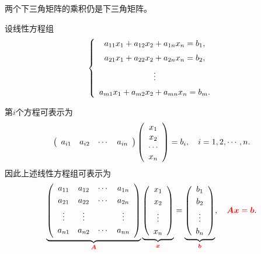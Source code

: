 \begin{zhu}
  两个下三角矩阵的乘积仍是下三角矩阵。
\end{zhu}

设线性方程组
$$
\left\{
  \begin{array}{c}
    a_{11}x_1 + a_{12}x_2 + a_{1n}x_n = b_1, \\[0.2cm]
    a_{21}x_1 + a_{22}x_2 + a_{2n}x_n = b_2, \\[0.2cm]
    \vdots \\[0.2cm]
    a_{m1}x_1 + a_{m2}x_2 + a_{mn}x_n = b_m.
  \end{array}
\right.
$$

第$i$个方程可表示为
$$
\left(
  \begin{array}{cccc}
    a_{i1} & a_{i2} & \cdots &  a_{in}
  \end{array}
\right)
\left(
  \begin{array}{c}
    x_{1} \\
    x_{2} \\
    \cdots   \\
    x_{n}
  \end{array}
\right) = b_i, \quad i=1,2,\cdots,n.
$$ 
因此上述线性方程组可表示为
$$
\underbrace{
  \left(
    \begin{array}{cccc}
      a_{11} & a_{12} & \cdots &  a_{1n} \\[0.1cm]
      a_{21} & a_{22} & \cdots &  a_{2n} \\[0.1cm]
      \vdots   & \vdots   &     & \vdots \\[0.1cm]
      a_{n1} & a_{n2} & \cdots &  a_{nn} \\[0.1cm]
    \end{array}
  \right)
}_{\textcolor{red}{\boldsymbol{A}}}
\underbrace{
  \left(
    \begin{array}{c}
      x_{1} \\[0.1cm]
      x_{2} \\[0.1cm]
      \vdots  \\[0.1cm]
      x_{n}
    \end{array}
  \right)
}_{\textcolor{red}{{\boldsymbol{x}}}}
=     
\underbrace{
  \left(
    \begin{array}{c}
      b_{1} \\[0.1cm]
      b_{2} \\[0.1cm]
      \vdots  \\[0.1cm]
      b_{n}
    \end{array}
  \right)
}_{\textcolor{red}{{\boldsymbol{b}}}},  
\quad \textcolor{red}{\boldsymbol{A}{\boldsymbol{x}}={\boldsymbol{b}}}.
$$
% 
% 




